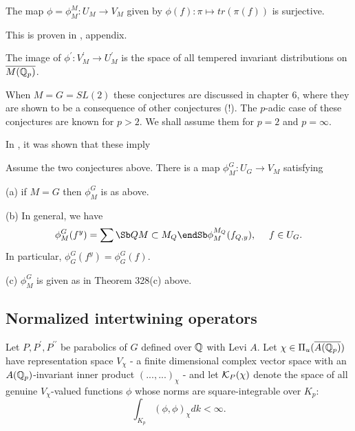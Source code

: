 \begin{conjecture}
The map $\phi =\phi_M^M :U_M\rightarrow V_M$ given by
$\phi (f):\pi \longmapsto tr(\pi (f)) $ is surjective.
\end{conjecture}

This is proven in \cite{A16}, appendix.

\begin{conjecture}
The image of $\phi ^{\prime }:V_M^{\prime }\rightarrow U_M^{\prime }$ is the
space of all tempered invariant distributions on
$\overline{M({\Bbb{Q}}_p)}$.
\end{conjecture}

When $M=G=SL(2)$ these conjectures are discussed in chapter 6, where
they are shown to be a consequence of other conjectures (!).
The $p$-adic case of these conjectures are known for
$p>2$. We shall assume them for $p=2$ and $p=\infty$.


In \cite{A6}, it was shown that these imply
\begin{theorem} Assume the two conjectures above.
There is a map
$\phi^G_M :U_G\rightarrow V_M$ satisfying

(a) if $M=G$ then $\phi_M^G$ is as above.

(b) In general, we have
\[
\phi_M^G(f^y)=
\sum\Sb Q \\ M\subset M_Q\endSb
\phi_M^{M_Q}(f_{Q,y}),\ \ \ \ f\in U_G.
\]
In particular, $\phi_G^G(f^y)=\phi_G^G(f)$.

(c) $\phi_M^G$ is given as in Theorem 328(c) above.
\end{theorem}

\subsection{Normalized intertwining operators}

Let $P,P^{\prime },P^{\prime \prime }$ be parabolics of
$G$ defined over ${\Bbb{Q}}$
with Levi $A$. Let $\chi \in \Pi _u({\overline{A({\Bbb{Q}}_p)}})$ have
representation space $V_\chi $ - a finite dimensional complex vector space
with an ${A({\Bbb {Q}}_p)}$-invariant inner product
$(...,...)_\chi $ - and let ${\cal{K}}_P(\chi )$ denote the space of all
genuine $V_\chi $-valued functions $\phi $
whose norms are square-integrable over
${K_p}$: 
\[
\int_{K_p}(\phi ,\phi )_\chi dk<\infty . 
\]

